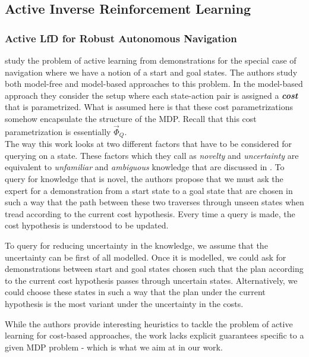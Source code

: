  

\subsection{Active Inverse Reinforcement Learning}

\subsubsection{Active LfD for Robust Autonomous Navigation}
\label{sec:navigation}
\citet{DBLP:conf/icra/SilverBS12} study the problem of active learning from demonstrations for the special case of navigation where we have a notion of a start and goal states. 
The authors study both model-free and model-based approaches to this problem. In the model-based approach they consider the setup where each state-action pair is assigned a \textbf{\textit{cost}} that is parametrized. What is assumed here is that these cost parametrizations somehow encapsulate the structure of the MDP. Recall that this cost parametrization is essentially $\vec{\Phi}_Q$. \\

The way this work looks at two different factors that have to be considered for querying on a state. These factors which they call as \textit{novelty} and \textit{uncertainty} are equivalent to  
\textit{unfamiliar} and \textit{ambiguous} knowledge that are discussed in  \citet{Chernova:2009:IPL:1622716.1622717}. To query for knowledge that is novel, the authors propose that we must ask the expert for a demonstration from a start state to a goal state that are chosen in such a way that the path between these two traverses through unseen states when tread according to the current cost hypothesis. Every time a query is made, the cost hypothesis is understood to be updated. 

To query for reducing uncertainty in the knowledge, we assume that the uncertainty can be first of all modelled. Once it is modelled, we could ask for demonstrations between start and goal states chosen such that the plan according to the current cost hypothesis passes through uncertain states. Alternatively, we could choose these states in such a way that the plan under the current hypothesis is the most variant under the uncertainty in the costs. 

While the authors provide interesting heuristics to tackle the problem of active learning for cost-based approaches, the work lacks explicit guarantees specific to a given MDP problem - which is what we aim at in our work. 

